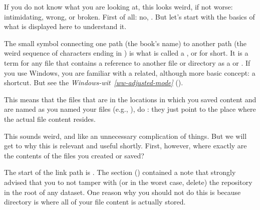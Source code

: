 \sphinxAtStartPar
If you do not know what you are looking at,
this looks weird, if not worse: intimidating, wrong, or broken.
First of all: no, . But let’s start with the basics of what is displayed
here to understand it.

\sphinxAtStartPar
The small \sphinxcode{\sphinxupquote{\sphinxhyphen{}\textgreater{}}} symbol connecting one path (the book’s name) to another path (the weird
sequence of characters ending in ) is what is called a
, {\hyperref[\detokenize{glossary:term-symlink}]{}} or  for short.
It is a term for any file that contains a reference to another file or directory as
a {\hyperref[\detokenize{glossary:term-relative-path}]{}} or {\hyperref[\detokenize{glossary:term-absolute-path}]{}}.
If you use Windows, you are familiar with a related, although more basic concept: a shortcut. But see the \textit{Windows-wit}~{\windowswiticoninline}\textit{\ref{ww-adjusted-mode}} {\hyperref[\detokenize{basics/101-115-symlinks:ww-adjusted-mode}]{}} ().

\sphinxAtStartPar
This means that the files that are in the locations in which you saved content
and are named as you named your files (e.g., ),
do :
they just point to the place where the actual file content resides.

\sphinxAtStartPar
This sounds weird, and like an unnecessary complication of things. But we will
get to why this is relevant and useful shortly. First, however,
where exactly are the contents of the files you created or saved?

\sphinxAtStartPar
The start of the link path is . The section {\hyperref[\detokenize{basics/101-101-create:createds}]{}} () contained
a note that strongly advised that you to not tamper with
(or in the worst case, delete) the 
repository in the root of any dataset. One reason
why you should not do this is because   directory is where all of your file content
is actually stored.

